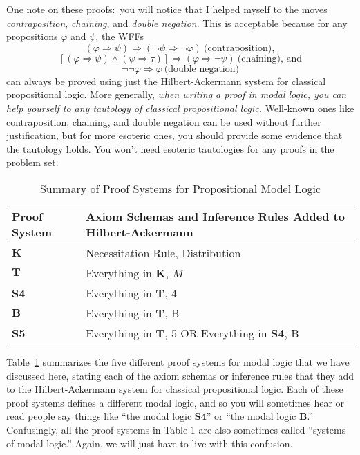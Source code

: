 \documentclass[11pt]{article}
\theoremstyle{definition}
\theoremstyle{remark}
\begin{document}
One note on these proofs:\ you will notice that I helped myself to the moves \textit{contraposition}, \textit{chaining}, and \textit{double negation}. This is acceptable because for any propositions $\varphi$ and $\psi$, the WFFs $$(\varphi\Rightarrow \psi)\Rightarrow(\neg \psi\Rightarrow \neg\varphi) \ \text{(contraposition)},$$
$$[(\varphi\Rightarrow \psi) \wedge (\psi\Rightarrow \tau)]\Rightarrow(\varphi\Rightarrow \neg\psi) \ \text{(chaining), and}$$
$$\neg\neg \varphi \Rightarrow \varphi \ \text{(double negation)}$$ can always be proved using just the Hilbert-Ackermann system for classical propositional logic. More generally, \textit{when writing a proof in modal logic, you can help yourself to any tautology of classical propositional logic.} Well-known ones like contraposition, chaining, and double negation can be used without further justification, but for more esoteric ones, you should provide some evidence that the tautology holds. You won't need esoteric tautologies for any proofs in the problem set.\par 


\begin{table}[]
    \centering
    \begin{tabular}{|l|l|}
    \hline
     Proof System  &  Axiom Schemas and Inference Rules Added to Hilbert-Ackermann\\
     \hline
     $\mathbf{K}$  & Necessitation Rule, Distribution\\
     \hline
     $\mathbf{T}$ & Everything in $\mathbf{K}$, $M$\\
     \hline
     \textbf{S4} & Everything in $\mathbf{T}$, 4\\
          \hline
     $\mathbf{B}$ & Everything in $\mathbf{T}$, B\\
     \hline
     \textbf{S5} & Everything in $\mathbf{T}$, 5 OR Everything in \textbf{S4}, B\\
     \hline
    \end{tabular}
    \caption{Summary of Proof Systems for Propositional Model Logic}
    \label{tab:systems}
\end{table}


Table~\ref{tab:systems} summarizes the five different proof systems for modal logic that we have discussed here, stating each of the axiom schemas or inference rules that they add to the Hilbert-Ackermann system for classical propositional logic. Each of these proof systems defines a different modal logic, and so you will sometimes hear or read people say things like ``the modal logic \textbf{S4}'' or ``the modal logic \textbf{B}.'' Confusingly, all the proof systems in Table 1 are also sometimes called ``systems of modal logic.'' Again, we will just have to live with this confusion.\par 
\end{document}
